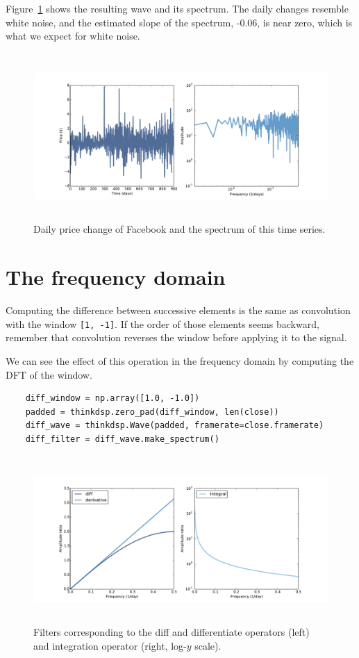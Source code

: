 \documentclass[12pt]{book}
\begin{document}
Figure~\ref{fig.diff_int2} shows the resulting wave and its spectrum.
The daily changes resemble white noise, and the estimated slope of the
spectrum, -0.06, is near zero, which is what we expect for white
noise.

\begin{figure}
\centerline{\includegraphics[height=2.5in]{figs/diff_int2.pdf}}
\caption{Daily price change of Facebook and the spectrum of this time series.}
\label{fig.diff_int2}
\end{figure}


\section{The frequency domain}

Computing the difference
between successive elements is the same as convolution with
the window {\tt [1, -1]}.
If the order of those elements seems backward,
remember that convolution reverses the window before applying it
to the signal.

We can see the effect of this operation in the frequency domain
by computing the DFT of the window.  

\begin{verbatim}
    diff_window = np.array([1.0, -1.0])
    padded = thinkdsp.zero_pad(diff_window, len(close))
    diff_wave = thinkdsp.Wave(padded, framerate=close.framerate)
    diff_filter = diff_wave.make_spectrum()
\end{verbatim}

\begin{figure}
\centerline{\includegraphics[height=2.5in]{figs/diff_int3.pdf}}
\caption{Filters corresponding to the diff and differentiate operators (left) and integration operator (right, log-$y$ scale).}
\label{fig.diff_int3}
\end{figure}
\end{document}

